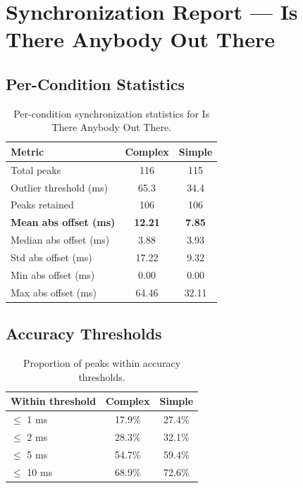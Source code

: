
\section*{Synchronization Report --- Is There Anybody Out There}

\subsection*{Per-Condition Statistics}

\begin{table}[h!]
\centering
\begin{tabular}{|l|c|c|}
\hline
Metric & Complex & Simple \\
\hline
Total peaks & 116 & 115 \\
Outlier threshold (ms) & 65.3 & 34.4 \\
Peaks retained & 106 & 106 \\
\textbf{Mean abs offset (ms)} & \textbf{12.21} & \textbf{7.85} \\
Median abs offset (ms) & 3.88 & 3.93 \\
Std abs offset (ms) & 17.22 & 9.32 \\
Min abs offset (ms) & 0.00 & 0.00 \\
Max abs offset (ms) & 64.46 & 32.11 \\
\hline
\end{tabular}
\caption{Per-condition synchronization statistics for Is There Anybody Out There.}
\label{tab:sync_stats}
\end{table}

\subsection*{Accuracy Thresholds}

\begin{table}[h!]
\centering
\begin{tabular}{|l|c|c|}
\hline
Within threshold & Complex & Simple \\
\hline
$\leq$ 1 ms & 17.9\% & 27.4\% \\
$\leq$ 2 ms & 28.3\% & 32.1\% \\
$\leq$ 5 ms & 54.7\% & 59.4\% \\
$\leq$ 10 ms & 68.9\% & 72.6\% \\
\hline
\end{tabular}
\caption{Proportion of peaks within accuracy thresholds.}
\label{tab:sync_accuracy}
\end{table}

